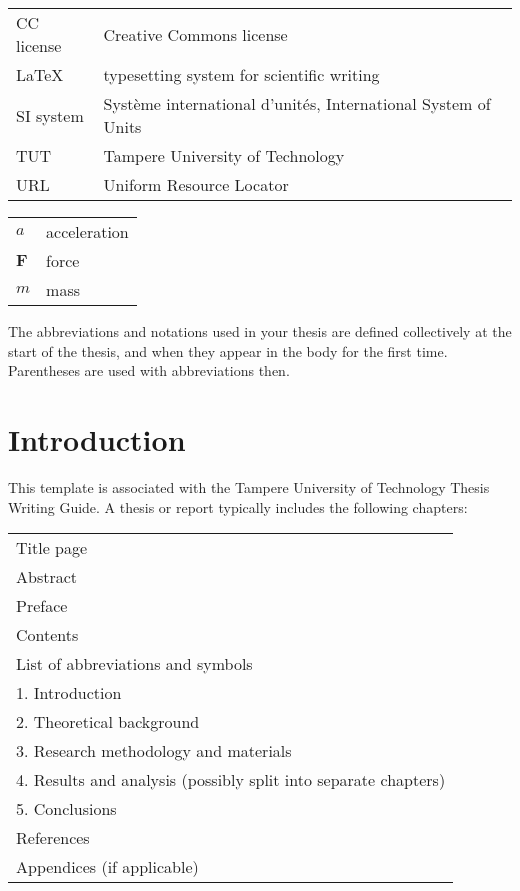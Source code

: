 \documentclass[twoside]{tutthesis} %
\begin{document}

\begin{tabular}[h]{@{} p{} p{} @{}}
CC license & Creative Commons license \\
LaTeX & typesetting system for scientific writing \\
SI system & Système international d'unités, International System of Units \\
TUT & Tampere University of Technology \\
URL & Uniform Resource Locator 
\end{tabular}

\begin{tabular}[h]{@{} p{} p{} @{}}
$a$ & acceleration \\
$\mathbf{F}$ & force \\
$m$ & mass
\end{tabular}

The abbreviations and notations used in your thesis are defined collectively at the start of the thesis, and when they appear in the body for the first time.
Parentheses are used with abbreviations then.



\chapter{Introduction}
\label{ch:Introduction}

This template is associated with the Tampere University of Technology Thesis Writing Guide.
A thesis or report typically includes the following chapters:

\begin{tabular}[h]{l}
Title page\\
Abstract\\

Preface\\
Contents\\
List of abbreviations and symbols\\
1. Introduction\\
2. Theoretical background\\
3. Research methodology and materials\\
4. Results and analysis (possibly split into separate chapters) \\
5. Conclusions\\
References\\
Appendices (if applicable)
\end{tabular}
\end{document}
